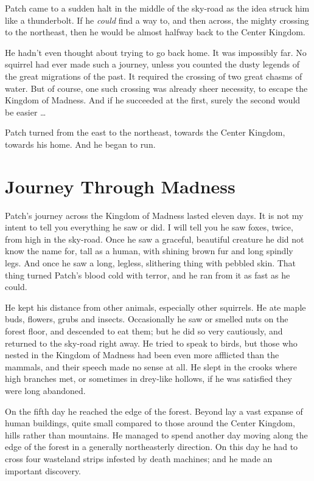 \documentclass[ebook,oneside,openany,12pt]{memoir}
\begin{document}
Patch came to a sudden halt in the middle of the sky-road as the idea
struck him like a thunderbolt. If he \emph{could} find a way to, and
then across, the mighty crossing to the northeast, then he would be
almost halfway back to the Center Kingdom.

He hadn’t even thought about trying to go back home. It was impossibly
far. No squirrel had ever made such a journey, unless you counted the
dusty legends of the great migrations of the past. It required the
crossing of two great chasms of water. But of course, one such
crossing was already sheer necessity, to escape the Kingdom of
Madness. And if he succeeded at the first, surely the second would be
easier …

Patch turned from the east to the northeast, towards the Center
Kingdom, towards his home. And he began to run.


\section{Journey Through Madness}

Patch’s journey across the Kingdom of Madness lasted eleven days. It
is not my intent to tell you everything he saw or did. I will tell you
he saw foxes, twice, from high in the sky-road. Once he saw a
graceful, beautiful creature he did not know the name for, tall as a
human, with shining brown fur and long spindly legs. And once he saw a
long, legless, slithering thing with pebbled skin. That thing turned
Patch’s blood cold with terror, and he ran from it as fast as he
could.

He kept his distance from other animals, especially other
squirrels. He ate maple buds, flowers, grubs and insects. Occasionally
he saw or smelled nuts on the forest floor, and descended to eat them;
but he did so very cautiously, and returned to the sky-road right
away. He tried to speak to birds, but those who nested in the Kingdom
of Madness had been even more afflicted than the mammals, and their
speech made no sense at all. He slept in the crooks where high
branches met, or sometimes in drey-like hollows, if he was satisfied
they were long abandoned.

On the fifth day he reached the edge of the forest. Beyond lay a vast
expanse of human buildings, quite small compared to those around the
Center Kingdom, hills rather than mountains. He managed to spend
another day moving along the edge of the forest in a generally
northeasterly direction. On this day he had to cross four wasteland
strips infested by death machines; and he made an important discovery.
\end{document}
